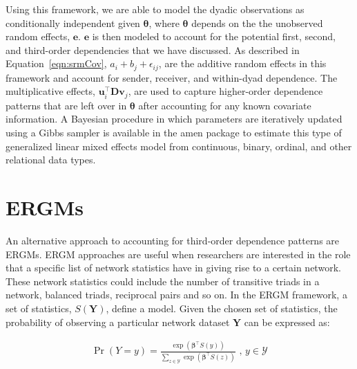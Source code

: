 \documentclass[9pt,twocolumn,twoside,lineno]{pnas-new}
\newcommand{\pkg}[1]{{\fontseries{b}\selectfont #1}}
\begin{document}
Using this framework, we are able to model the dyadic observations as conditionally independent given $\bm\theta$, where $\bm\theta$ depends on the the unobserved random effects, $\mathbf{e}$. $\mathbf{e}$ is then modeled to account for the potential first, second, and third-order dependencies that we have discussed. As described in Equation~\ref{eqn:srmCov}, $a_{i} + b_{j}  + \epsilon_{ij}$, are the additive random effects in this framework and account for sender, receiver, and within-dyad dependence. The multiplicative effects, $\textbf{u}_{i}^{\top} \textbf{D} \textbf{v}_{j}$, are used to capture higher-order dependence patterns that are left over in $\bm\theta$ after accounting for any known covariate information. A Bayesian procedure in which parameters are iteratively updated using a Gibbs sampler is available in the \pkg{amen} package to estimate this type of generalized linear mixed effects model from continuous, binary, ordinal, and other relational data types.%

\section{\textbf{ERGMs}}

An alternative approach to accounting for third-order dependence patterns are ERGMs. ERGM approaches are useful when researchers are interested in the role that a specific list of network statistics have in giving rise to a certain network. These network statistics could include the number of transitive triads in a network, balanced triads, reciprocal pairs and so on. In the ERGM framework, a set of statistics, $S(\mathbf{Y})$, define a model. Given the chosen set of statistics, the probability of observing a particular network dataset $\mathbf{Y}$ can be expressed as:

\begin{align}
\Pr(Y = y) = \frac{ \exp( \bm\beta^{\top} S(y)  )  }{ \sum_{z \in \mathcal{Y}} \exp( \bm\beta^{\top} S(z)  )  } \text{ ,  } y \in \mathcal{Y}
\label{eqn:ergm}
\end{align}
\end{document}
